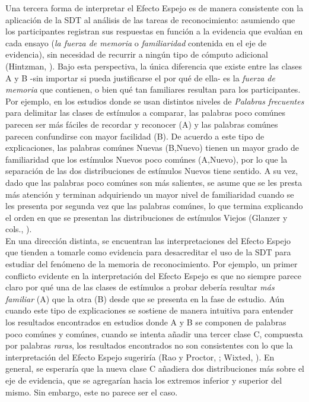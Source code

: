 Una tercera forma de interpretar el Efecto Espejo es de manera consistente con la aplicación de la SDT al análisis de las tareas de reconocimiento: asumiendo que los participantes registran sus respuestas en función a la evidencia que evalúan en cada ensayo (\textit{la fuerza de memoria} o \textit{familiaridad} contenida en el eje de evidencia), sin necesidad de recurrir a ningún tipo de cómputo adicional (Hintzman, \citeyear{Hintzman1994}). Bajo esta perspectiva, la única diferencia que existe entre las clases A y B -sin importar si pueda justificarse el por qué de ella- es la \textit{fuerza de memoria} que contienen, o bien qué tan familiares resultan para los participantes. Por ejemplo, en los estudios donde se usan distintos niveles de \textit{Palabras frecuentes} para delimitar las clases de estímulos a comparar, las palabras poco comúnes parecen ser más fáciles de recordar y reconocer (A) y las palabras comúnes parecen confundirse con mayor facilidad (B). De acuerdo a este tipo de explicaciones, las palabras comúnes Nuevas (B,Nuevo) tienen un mayor grado de familiaridad que los estímulos Nuevos poco comúnes (A,Nuevo), por lo que la separación de las dos distribuciones de estímulos Nuevos tiene sentido. A su vez, dado que las palabras poco comúnes son más salientes, se asume que se les presta más atención y terminan adquiriendo un mayor nivel de familiaridad cuando se les presenta por segunda vez que las palabras comúnes, lo que termina explicando el orden en que se presentan las distribuciones de estímulos Viejos (Glanzer y cols., \citeyear{Glanzer1993}).\\

En una dirección distinta, se encuentran las interpretaciones del Efecto Espejo que tienden a tomarle como evidencia para desacreditar el uso de la SDT para estudiar del fenómeno de la memoria de reconocimiento. Por ejemplo, un primer conflicto evidente en la interpretación del Efecto Espejo es que no siempre parece claro por qué una de las clases de estímulos a probar debería resultar \textit{más familiar} (A) que la otra (B) desde que se presenta en la fase de estudio. Aún cuando este tipo de explicaciones se sostiene de manera intuitiva para entender los resultados encontrados en estudios donde A y B se componen de palabras poco comúnes y comúnes, cuando se intenta añadir una tercer clase C, compuesta por palabras \textit{raras}, los resultados encontrados no son consistentes con lo que la interpretación del Efecto Espejo sugeriría (Rao y Proctor, \citeyear{Rao1984}; Wixted, \citeyear{Wixted1992}). En general, se esperaría que la nueva clase C añadiera dos distribuciones más sobre el eje de evidencia, que se agregarían hacia los extremos inferior y superior del mismo. Sin embargo, este no parece ser el caso.\\

